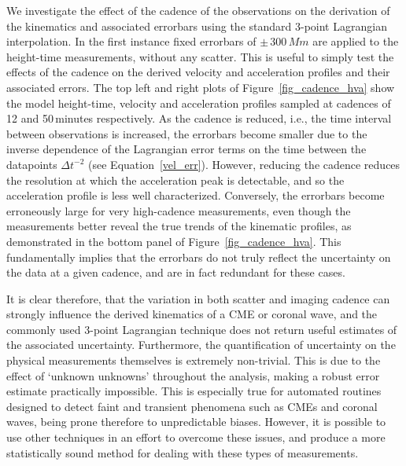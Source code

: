 \documentclass[structabstract]{aa}
\begin{document}
We investigate the effect of the cadence of the observations on the derivation of the kinematics and associated errorbars using the standard 3-point Lagrangian interpolation. In the first instance fixed errorbars of $\pm\,300\,Mm$ are applied to the height-time measurements, without any scatter. This is useful to simply test the effects of the cadence on the derived velocity and acceleration profiles and their associated errors. The top left and right plots of Figure~\ref{fig_cadence_hva} show the model height-time, velocity and acceleration profiles sampled at cadences of 12 and 50\,minutes respectively. As the cadence is reduced, i.e., the time interval between observations is increased, the errorbars become smaller due to the inverse dependence of the Lagrangian error terms on the time between the datapoints $\Delta t^{-2}$ (see Equation~\ref{vel_err}). However, reducing the cadence reduces the resolution at which the acceleration peak is detectable, and so the acceleration profile is less well characterized. Conversely, the errorbars become erroneously large for very high-cadence measurements, even though the measurements better reveal the true trends of the kinematic profiles, as demonstrated in the bottom panel of Figure~\ref{fig_cadence_hva}. This fundamentally implies that the errorbars do not truly reflect the uncertainty on the data at a given cadence, and are in fact redundant for these cases.



It is clear therefore, that the variation in both scatter and imaging cadence can strongly influence the derived kinematics of a CME or coronal wave, and the commonly used 3-point Lagrangian technique does not return useful estimates of the associated uncertainty. Furthermore, the quantification of uncertainty on the physical measurements themselves is extremely non-trivial. This is due to the effect of `unknown unknowns' throughout the analysis, making a robust error estimate practically impossible. This is especially true for automated routines designed to detect faint and transient phenomena such as CMEs and coronal waves, being prone therefore to unpredictable biases. However, it is possible to use other techniques in an effort to overcome these issues, and produce a more statistically sound method for dealing with these types of measurements.
\end{document}
